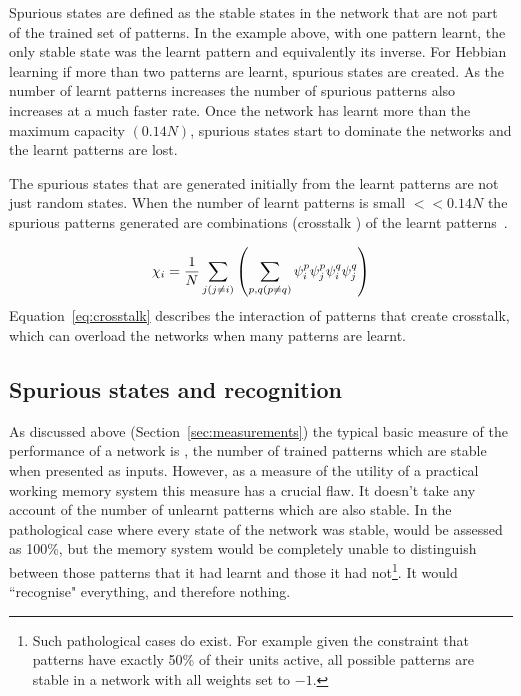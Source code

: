 
Spurious states are defined as the stable states in the network that are not part of the trained set of patterns.  In the  example above, with one pattern learnt, the only stable state was the learnt pattern and equivalently its inverse.  For Hebbian learning if more than two patterns are learnt, spurious states are created.  As the number of learnt patterns increases the number of spurious patterns also increases at a much faster rate.  Once the network has learnt more than the maximum capacity $(0.14N)$, spurious states start to dominate the networks and the learnt patterns are lost.

The spurious states that are generated initially from the learnt patterns are not just random states.  When the number of learnt patterns is small $<<0.14N$ the spurious patterns generated are combinations (crosstalk ) of the learnt patterns~\citep{Amit1987}.

\begin{equation}
	\label{eq:crosstalk}
	\displaystyle \chi_{i} = \frac{1}{N}\sum_{{j \\ (j \ne i)}}\left( \sum_{p,q (p\ne q)} 		\psi_{i}^{p}\psi_{j}^{p}\psi_{i}^{q}\psi_{j}^{q}\right)
\end{equation}
Equation~\eqref{eq:crosstalk} describes the interaction of patterns that create crosstalk, which can overload the networks when many patterns are learnt.



\subsection{Spurious states and recognition} 

As discussed above (Section~\ref{sec:measurements}) the typical basic measure of the performance of a network is , the number of trained patterns which are stable when presented as inputs.  However, as a measure of the utility of a practical working memory system this measure has a crucial flaw.  It doesn't take any account of the number of unlearnt patterns which are also stable.  In the pathological case where every state of the network was stable,  would be assessed as 100\%, but the memory system would be completely unable to distinguish between those patterns that it had learnt and those it had not\footnote{Such pathological cases do exist.  For example given the constraint that patterns have exactly 50\% of their units active, all possible patterns are stable in a network with all weights set to $-1$.}.  It would ``recognise" everything, and therefore nothing.

